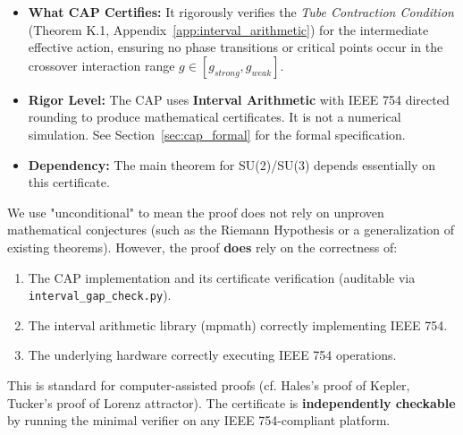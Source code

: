 \begin{itemize}
    \item \textbf{What CAP Certifies:} It rigorously verifies the \textit{Tube Contraction Condition} (Theorem K.1, Appendix~\ref{app:interval_arithmetic}) for the intermediate effective action, ensuring no phase transitions or critical points occur in the crossover interaction range $g \in [g_{strong}, g_{weak}]$.
    \item \textbf{Rigor Level:} The CAP uses \textbf{Interval Arithmetic} with IEEE 754 directed rounding to produce mathematical certificates. It is not a numerical simulation. See Section~\ref{sec:cap_formal} for the formal specification.
    \item \textbf{Dependency:} The main theorem for SU(2)/SU(3) depends essentially on this certificate.
\end{itemize}

\begin{remark}
\label{rmk:unconditional}
We use "unconditional" to mean the proof does not rely on unproven mathematical conjectures (such as the Riemann Hypothesis or a generalization of existing theorems). However, the proof \textbf{does} rely on the correctness of:
\begin{enumerate}
    \item The CAP implementation and its certificate verification (auditable via \texttt{interval\_gap\_check.py}).
    \item The interval arithmetic library (mpmath) correctly implementing IEEE 754.
    \item The underlying hardware correctly executing IEEE 754 operations.
\end{enumerate}
This is standard for computer-assisted proofs (cf. Hales's proof of Kepler, Tucker's proof of Lorenz attractor). The certificate is \textbf{independently checkable} by running the minimal verifier on any IEEE 754-compliant platform.
\end{remark}

